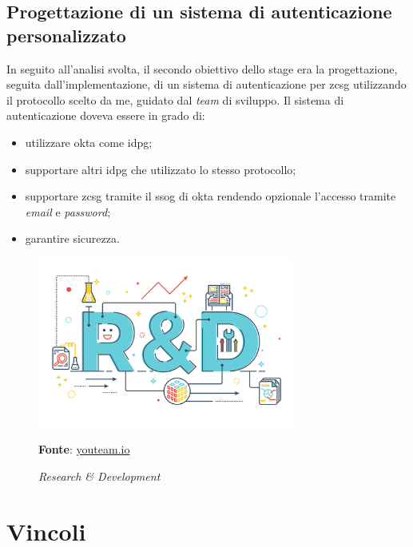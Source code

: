     \subsection{Progettazione di un sistema di autenticazione personalizzato}
        In seguito all'analisi svolta, il secondo obiettivo dello stage era la progettazione, seguita dall'implementazione, di un sistema di autenticazione per \gls{zcsg} utilizzando il protocollo scelto da me, guidato dal \textit{team} di sviluppo. Il sistema di autenticazione doveva essere in grado di:
        \begin{itemize}
            \setlength\itemsep{0em}
            \item utilizzare \gls{okta} come \gls{idpg};
            \item supportare altri \gls{idpg} che utilizzato lo stesso protocollo;
            \item supportare \gls{zcsg} tramite il \gls{ssog} di \gls{okta} rendendo opzionale l'accesso tramite \textit{email} e \textit{password};
            \item garantire sicurezza.
        \end{itemize}
    \begin{figure}[h]
        \centering
        \includegraphics[width=0.75\textwidth]{immagini/rd.jpg}
        \caption{\textit{Research \& Development}}
        \textbf{Fonte}:
        \href{https://youteam.io/blog/research-and-development-the-fourth-pillar-of-software-development/}{youteam.io}
        \label{fig: Research & Development}
    \end{figure}

\section{Vincoli}
